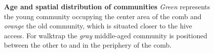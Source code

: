 \begin{figure}[!htb]
	
	\caption[Age and spatial distribution of communities]{\textbf{Age and spatial distribution of communities} \emph{Green} represents the young community occupying the center area of the comb and \emph{orange} the old community, which is situated closer to the hive access. For walktrap the \emph{gray} middle-aged community is positioned between the other to and in the periphery of the comb.}
	\label{fig:n3-communities}
\end{figure}